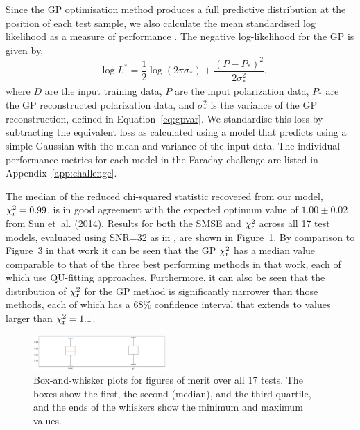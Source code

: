 \documentclass[fleqn,usenatbib]{mnras}
\begin{document}
Since the GP optimisation method produces a full predictive distribution at the position of each test sample, we also calculate the mean standardised log likelihood as a measure of performance \citep{3569}. The negative log-likelihood for the GP is given by,
%
\begin{equation}
\label{eq:logl}
-\log L^{\ast} = \frac{1}{2}\log(2\pi \sigma_{\ast}) + \frac{(P - P_{\ast})^2}{2\sigma_{\ast}^2},
\end{equation}
%
where $D$ are the input training data, $P$ are the input polarization data, $P_{\ast}$ are the GP reconstructed polarization data, and $\sigma_{\ast}^2$ is the variance of the GP reconstruction, defined in Equation~\ref{eq:gpvar}.
We standardise this loss by subtracting the equivalent loss as calculated using a model that predicts using a simple Gaussian with the mean and variance of the input data. The individual performance metrics for each model in the Faraday challenge are listed in Appendix~\ref{app:challenge}.

The median of the reduced chi-squared statistic recovered from our model, $\chi^2_{\rm r} = 0.99$, is in good agreement with the expected optimum value of $1.00\pm0.02$ from Sun et~al. (2014). Results for both the SMSE and $\chi_{\rm r}^2$ across all 17 test models, evaluated using SNR=32 as in \cite{Sun_2015}, are shown in Figure~\ref{fig:sunmetrics}. By comparison to Figure~3 in that work it can be seen that the GP $\chi_{\rm r}^2$ has a median value comparable to that of the three best performing methods in that work, each of which use QU-fitting approaches. Furthermore, it can also be seen that the distribution of $\chi_{\rm r}^2$ for the GP method is significantly narrower than those methods, each of which has a 68\% confidence interval that extends to values larger than $\chi_{\rm r}^2=1.1$.
%
\begin{figure}
    \centering
    \includegraphics[width=0.45\textwidth]{./FIGURES/smse.png}
    \caption{Box-and-whisker plots for figures of merit over all 17 tests. The boxes show the first, the second (median), and the third quartile, and the ends of the whiskers show the minimum and maximum values.}
    \label{fig:sunmetrics}
\end{figure}

%
%
\end{document}
